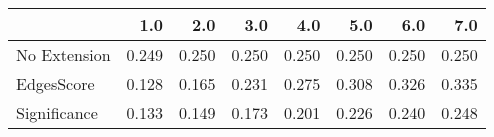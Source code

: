 \begin{tabular}{lrrrrrrr}
\toprule
{} &   1.0 &   2.0 &   3.0 &   4.0 &   5.0 &   6.0 &   7.0 \\
\midrule
No Extension & 0.249 & 0.250 & 0.250 & 0.250 & 0.250 & 0.250 & 0.250 \\
EdgesScore   & 0.128 & 0.165 & 0.231 & 0.275 & 0.308 & 0.326 & 0.335 \\
Significance & 0.133 & 0.149 & 0.173 & 0.201 & 0.226 & 0.240 & 0.248 \\
\bottomrule
\end{tabular}
